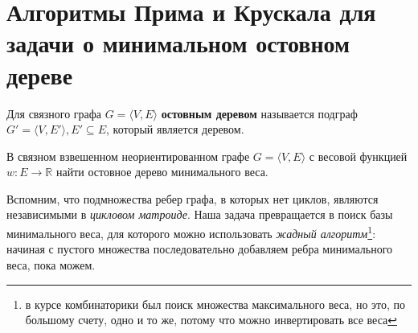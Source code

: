 \let\bf\bfseries
\let\it\itshape
\section{Алгоритмы Прима и Крускала для задачи о минимальном остовном дереве}

\secauthor{\egor}

\begin{definition}
	Для связного графа $G=\langle V,E\rangle$ {\bf остовным деревом} называется подграф $G'=\langle V,E'\rangle,E'\subseteq E$, который является деревом.
\end{definition}
\begin{problem*}
	В связном взвешенном неориентированном графе $G=\langle V,E\rangle$ с весовой функцией $w\colon E\to\mathbb{R}$ найти остовное дерево минимального веса.
\end{problem*}
Вспомним, что подмножества ребер графа, в которых нет циклов, являются независимыми в {\it цикловом матроиде}. Наша задача превращается в поиск базы минимального веса, для которого можно использовать {\it жадный алгоритм}\footnote{в курсе комбинаторики был поиск множества максимального веса, но это, по большому счету, одно и то же, потому что можно инвертировать все веса}: начиная с пустого множества последовательно добавляем ребра минимального веса, пока можем.

